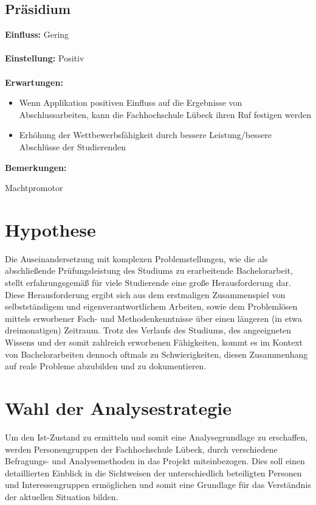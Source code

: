 \documentclass{scrreprt}
\begin{document}
\subsection{Präsidium}
\textbf{Einfluss:} Gering\\\\
\textbf{Einstellung:} Positiv\\\\
\textbf{Erwartungen:}
\begin{itemize}
\item Wenn Applikation positiven Einfluss auf die Ergebnisse von Abschlussarbeiten, kann die Fachhochschule Lübeck ihren Ruf festigen werden
\item Erhöhung der Wettbewerbsfähigkeit durch bessere Leistung/bessere Abschlüsse der Studierenden
\end{itemize}
\textbf{Bemerkungen:}\par Machtpromotor
\newpage


\section{Hypothese}
\par Die Auseinandersetzung mit komplexen Problemstellungen, wie die als abschließende Prüfungsleistung des Studiums zu erarbeitende Bachelorarbeit, stellt erfahrungsgemäß für viele Studierende eine große Herausforderung dar. Diese Herausforderung ergibt sich aus dem erstmaligen Zusammenspiel von selbstständigem und eigenverantwortlichem Arbeiten, sowie dem Problemlösen mittels erworbener Fach- und Methodenkenntnisse über einen längeren (in etwa dreimonatigen) Zeitraum.
Trotz des Verlaufs des Studiums, des angeeigneten Wissens und der somit zahlreich erworbenen Fähigkeiten, kommt es im Kontext von Bachelorarbeiten dennoch oftmals zu Schwierigkeiten, diesen Zusammenhang auf reale Probleme abzubilden und zu dokumentieren.

\section{Wahl der Analysestrategie}
\par Um den Ist-Zustand zu ermitteln und somit eine Analysegrundlage zu erschaffen, werden Personengruppen der Fachhochschule Lübeck, durch verschiedene Befragungs- und Analysemethoden in das Projekt miteinbezogen. Dies soll einen detaillierten Einblick in die Sichtweisen der unterschiedlich beteiligten Personen und Interessengruppen ermöglichen und somit eine Grundlage für das Verständnis der aktuellen Situation bilden.
\end{document}
